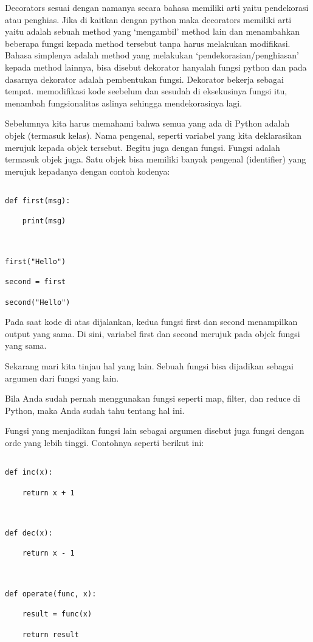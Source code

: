 \documentclass[12pt,a4paper]{article}
\begin{document}
Decorators sesuai dengan namanya secara bahasa memiliki arti yaitu pendekorasi atau penghias. Jika di kaitkan dengan python maka decorators memiliki arti yaitu adalah sebuah method yang ‘mengambil’ method lain dan menambahkan beberapa fungsi kepada method tersebut tanpa harus melakukan modifikasi. Bahasa simplenya adalah method yang melakukan ‘pendekorasian/penghiasan’ kepada method lainnya, bisa disebut dekorator hanyalah fungsi python dan pada dasarnya dekorator adalah pembentukan fungsi. Dekorator bekerja sebagai tempat. memodifikasi kode seebelum dan sesudah di eksekusinya fungsi itu, menambah fungsionalitas aslinya sehingga mendekorasinya lagi.



Sebelumnya kita harus memahami bahwa semua yang ada di Python adalah objek (termasuk kelas). Nama pengenal, seperti variabel yang kita deklarasikan merujuk kepada objek tersebut. Begitu juga dengan fungsi. Fungsi adalah termasuk objek juga. Satu objek bisa memiliki banyak pengenal (identifier) yang merujuk kepadanya dengan contoh kodenya:



\begin{verbatim}

def first(msg):

    print(msg)



first("Hello")

second = first

second("Hello")

\end{verbatim}



Pada saat kode di atas dijalankan, kedua fungsi first dan second menampilkan output yang sama. Di sini, variabel first dan second merujuk pada objek fungsi yang sama.

Sekarang mari kita tinjau hal yang lain. Sebuah fungsi bisa dijadikan sebagai argumen dari fungsi yang lain.

Bila Anda sudah pernah menggunakan fungsi seperti map, filter, dan reduce di Python, maka Anda sudah tahu tentang hal ini.

Fungsi yang menjadikan fungsi lain sebagai argumen disebut juga fungsi dengan orde yang lebih tinggi. Contohnya seperti berikut ini:



\begin{verbatim}

def inc(x):

    return x + 1

    

def dec(x):

    return x - 1

    

def operate(func, x):

    result = func(x)

    return result

\end{verbatim}
\end{document}
